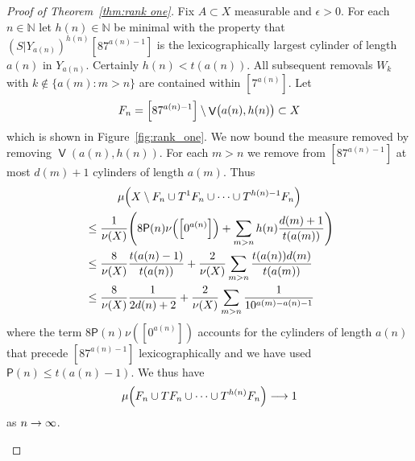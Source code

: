 \documentclass[AHL,Unicode,longabstracts,published]{cedram}
\DeclareMathOperator{\bad}{\mathsf{V}}
\newcommand{\N}{\mathbb{N}}
\renewcommand{\P}{\mathsf{P}}
\let\originalleft\left
\let\originalright\right
\renewcommand{\left}{\mathopen{}\mathclose\bgroup\originalleft}
\renewcommand{\right}{\aftergroup\egroup\originalright}
\renewcommand*{\to}{\mathchoice{\longrightarrow}{\rightarrow}{\rightarrow}{\rightarrow}}
\begin{document}
\begin{proof}[Proof of Theorem~\ref{thm:rank one}]
Fix $A \subset X$ measurable and $\epsilon > 0$. For each ${n \in \N}$ let $h(n) \in \N$ be minimal with the property that $(S|Y_{a(n)})^{h(n)} [8 7^{a(n)-1}]$ is the lexicographically largest cylinder of length $a(n)$ in $Y_{a(n)}$. Certainly $h(n) < t(a(n))$. All subsequent removals $W_k$ with $k \not\in \{a(m) : m > n \}$ are contained within $[7^{a(n)}]$. Let
\[
F_n=\left[87^{a(n)-1}\right]\setminus \bad \bigl(a(n),h(n)\bigr) \subset X
\]
which is shown in Figure~\ref{fig:rank_one}. We now bound the measure removed by removing $\bad(a(n),h(n))$. For each $m > n$ we remove from $[8 7^{a(n)-1}]$ at most $d(m) + 1$ cylinders of length $a(m)$. Thus
\begin{multline*}
\mu\left(X \setminus F_n \cup T^1 F_n \cup \dots \cup T^{h(n)-1} F_n\right)
\\
\begin{aligned}
&\le
\frac{1}{\nu(X)} \left(8 \P(n) \nu\left(\left[0^{a(n)}\right]\right) + \sum_{m > n} h(n) \frac{d(m)+1}{t(a(m))} \right)
\\
&\le
\frac{8}{\nu(X)} \frac{t(a(n)-1)}{t(a(n))} + \frac{2}{\nu(X)} \sum_{m > n} \frac{t(a(n)) d(m)}{t(a(m))}
\\
&\le
\frac{8}{\nu(X)} \frac{1}{2d(n)+2} + \frac{2}{\nu(X)} \sum_{m > n} \frac{1}{10^{a(m) - a(n)-1}}
\end{aligned}
\end{multline*}
where the term $8\P(n) \nu([0^{a(n)}])$ accounts for the cylinders of length $a(n)$ that precede $[87^{a(n)-1}]$ lexicographically and we have used $\P(n) \le t(a(n)-1)$. We thus have
\[
\mu\left(F_n \cup T F_n \cup \dots \cup T^{h(n)} F_n\right) \to 1
\]
as $n \to \infty$.

\begin{figure}[!h]

\centering

\end{figure}
\end{proof}
\end{document}
